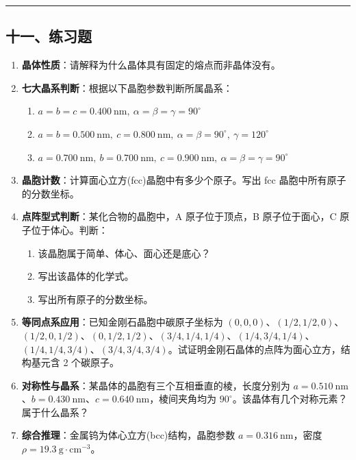 \documentclass[a4paper,11pt]{ctexart}
\providecommand{\tightlist}{\setlength{\itemsep}{0pt}\setlength{\parskip}{0pt}}
\newcommand{\箭}{\ensuremath{\rightarrow}}
\newcommand{\左箭}{\ensuremath{\leftarrow}}
\newcommand{\上箭}{\ensuremath{\uparrow}}
\newcommand{\下箭}{\ensuremath{\downarrow}}
\newcommand{\衡}{\ensuremath{\rightleftharpoons}}
\newcommand{\双箭}{\ensuremath{\leftrightarrow}}
\newcommand{\约等于}{\ensuremath{\approx}}
\newcommand{\小于等于}{\ensuremath{\leq}}
\newcommand{\大于等于}{\ensuremath{\geq}}
\newcommand{\不等于}{\ensuremath{\neq}}
\newcommand{\西格马}{\ensuremath{\sigma}}
\newcommand{\派}{\ensuremath{\pi}}
\begin{document}
\begin{center}\rule{0.5\linewidth}{0.5pt}\end{center}

\subsection{十一、练习题}\label{ux5341ux4e00ux7ec3ux4e60ux9898}

\begin{enumerate}
\def\labelenumi{\arabic{enumi}.}
\item
  \textbf{晶体性质}：请解释为什么晶体具有固定的熔点而非晶体没有。
\item
  \textbf{七大晶系判断}：根据以下晶胞参数判断所属晶系：

  \begin{enumerate}
  \def\labelenumii{(\arabic{enumii})}
  \tightlist
  \item
    \(a = b = c = 0.400\ \mathrm{nm},\ \alpha = \beta = \gamma = 90^\circ\)
  \item
    \(a = b = 0.500\ \mathrm{nm},\ c = 0.800\ \mathrm{nm},\ \alpha = \beta = 90^\circ,\ \gamma = 120^\circ\)
  \item
    \(a = 0.700\ \mathrm{nm},\ b = 0.700\ \mathrm{nm},\ c = 0.900\ \mathrm{nm},\ \alpha = \beta = \gamma = 90^\circ\)
  \end{enumerate}
\item
  \textbf{晶胞计数}：计算面心立方(fcc)晶胞中有多少个原子。写出 fcc 晶胞中所有原子的分数坐标。
\item
  \textbf{点阵型式判断}：某化合物的晶胞中，A 原子位于顶点，B 原子位于面心，C 原子位于体心。判断：

  \begin{enumerate}
  \def\labelenumii{(\arabic{enumii})}
  \tightlist
  \item
    该晶胞属于简单、体心、面心还是底心？
  \item
    写出该晶体的化学式。
  \item
    写出所有原子的分数坐标。
  \end{enumerate}
\item
  \textbf{等同点系应用}：已知金刚石晶胞中碳原子坐标为 \((0, 0, 0)\)、\((1/2, 1/2, 0)\)、\((1/2, 0, 1/2)\)、\((0, 1/2, 1/2)\)、\((3/4, 1/4, 1/4)\)、\((1/4, 3/4, 1/4)\)、\((1/4, 1/4, 3/4)\)、\((3/4, 3/4, 3/4)\)。试证明金刚石晶体的点阵为面心立方，结构基元含 2 个碳原子。
\item
  \textbf{对称性与晶系}：某晶体的晶胞有三个互相垂直的棱，长度分别为 \(a = 0.510\ \mathrm{nm}\)、\(b = 0.430\ \mathrm{nm}\)、\(c = 0.640\ \mathrm{nm}\)，棱间夹角均为 \(90^\circ\)。该晶体有几个对称元素？属于什么晶系？
\item
  \textbf{综合推理}：金属钨为体心立方(bcc)结构，晶胞参数 \(a = 0.316\ \mathrm{nm}\)，密度 \(\rho = 19.3\ \mathrm{g\cdot cm^{-3}}\)。


\end{enumerate}
\end{document}
